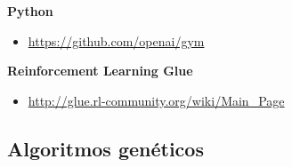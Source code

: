 \textbf{Python}

\begin{itemize}
\item \url{https://github.com/openai/gym}
\end{itemize}

\textbf{Reinforcement Learning Glue}

\begin{itemize}
\item \url{http://glue.rl-community.org/wiki/Main_Page}
\end{itemize}










\subsection{Algoritmos genéticos}

